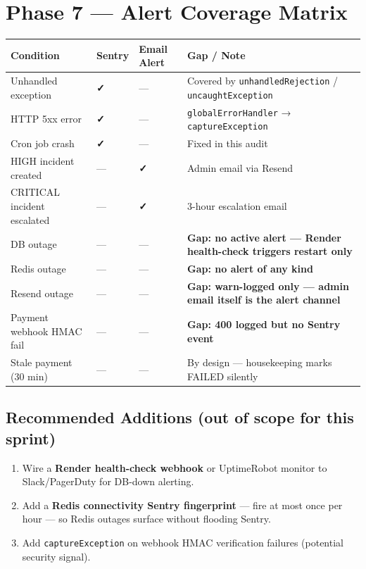 \documentclass[12pt,a4paper]{article}
\newcommand{\cellok}[1]{\cellcolor{ok!15}\textbf{\color{ok}#1}}
\newcommand{\cellwarn}[1]{\cellcolor{warn!20}\textbf{\color{warn}#1}}
\newcommand{\cellcrit}[1]{\cellcolor{crit!15}\textbf{\color{crit}#1}}
\begin{document}
\newpage

\section{Phase 7 — Alert Coverage Matrix}

\begin{longtable}{p{4cm}p{2.5cm}p{2.5cm}p{5cm}}
\toprule
\rowcolor{tableheadbg}
\textbf{\color{white}Condition} & \textbf{\color{white}Sentry} & \textbf{\color{white}Email Alert} & \textbf{\color{white}Gap / Note} \\
\midrule
Unhandled exception &
  \cellok{\faCheck} & — & Covered by \texttt{unhandledRejection} / \texttt{uncaughtException} \\
HTTP 5xx error &
  \cellok{\faCheck} & — & \texttt{globalErrorHandler} → \texttt{captureException} \\
Cron job crash &
  \cellok{\faCheck} & — & Fixed in this audit \\
HIGH incident created &
  — & \cellok{\faCheck} & Admin email via Resend \\
CRITICAL incident escalated &
  — & \cellok{\faCheck} & 3-hour escalation email \\
DB outage &
  — & — & \cellwarn{Gap: no active alert — Render health-check triggers restart only} \\
Redis outage &
  — & — & \cellcrit{Gap: no alert of any kind} \\
Resend outage &
  — & — & \cellcrit{Gap: warn-logged only — admin email itself is the alert channel} \\
Payment webhook HMAC fail &
  — & — & \cellwarn{Gap: 400 logged but no Sentry event} \\
Stale payment (30 min) &
  — & — & By design — housekeeping marks FAILED silently \\
\bottomrule
\end{longtable}

\subsection{Recommended Additions (out of scope for this sprint)}

\begin{enumerate}[leftmargin=*]
  \item Wire a \textbf{Render health-check webhook} or UptimeRobot monitor to
        Slack/PagerDuty for DB-down alerting.
  \item Add a \textbf{Redis connectivity Sentry fingerprint} — fire at most once
        per hour — so Redis outages surface without flooding Sentry.
  \item Add \texttt{captureException} on webhook HMAC verification failures
        (potential security signal).
\end{enumerate}
\end{document}
